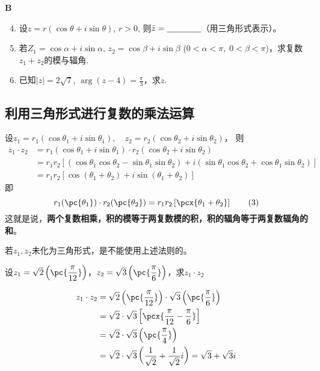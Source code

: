 \begin{center}
    \bfseries B
\end{center}

\begin{enumerate}\setcounter{enumi}{3}
    \item 设$z=r(\cos\theta +i\sin\theta )$, $r>0$, 
    则$\bar z=\underline{\qquad}\underline{\qquad}$（用三角形式表示）。
    \item  若$Z_1=\cos\alpha+i\sin\alpha$, $z_2=\cos\beta+i\sin\beta$ ($0<\alpha<\pi,\; 0<\beta<\pi$)，求复数$z_1+z_2$的模与辐角.
    \item 已知$|z|=2\sqrt{7}$, $\arg(z-4)=\frac{\pi}{3}$，求$z$.
\end{enumerate}

\subsection{利用三角形式进行复数的乘法运算}
设$z_1=r_1(\cos\theta_1+i\sin\theta_1),\quad z_2=r_2(\cos\theta_2+i\sin\theta_2)$，
则
\[\begin{split}
    z_1\cdot z_2&=r_1(\cos\theta_1+i\sin\theta_1)\cdot r_2(\cos\theta_2+i\sin\theta_2)\\
    &=r_1r_2[(\cos\theta_1\cos\theta_2-\sin\theta_1\sin\theta_2)+i(\sin\theta_1
    \cos\theta_2+\cos\theta_1\sin\theta_2)]\\
    &=r_1r_2[\cos(\theta_1+\theta_2)+i\sin(\theta_1+\theta_2)]        
\end{split}\]
即
\begin{equation}
r_1(\pc{\theta_1})\cdot r_2(\pc{\theta_2})=r_1r_2\left[\pcx{\theta_1+\theta_2}\right]\tag{3}
\end{equation}
这就是说，\textbf{两个复数相乘，积的模等于两复数模的积，积的辐角等于两复数辐角的和}。

\begin{remark}
    若$z_1,z_2$未化为三角形式，是不能使用上述法则的。
\end{remark}


\begin{example}
设$z_1=\sqrt{2}\left(\pc{\frac{\pi}{12}}\right)$，$z_2=\sqrt{3}\left(\pc{\frac{\pi}{6}}\right)$，求$z_1\cdot z_2$
\end{example}

\begin{solution}
\[\begin{split}
z_1\cdot z_2&=\sqrt{2}\left(\pc{\frac{\pi}{12}}\right)\cdot \sqrt{3}\left(\pc{\frac{\pi}{6}}\right)\\
&=\sqrt{2}\cdot \sqrt{3}\left[\pcx{\frac{\pi}{12}-\frac{\pi}{6}}\right]\\
&=\sqrt{2}\cdot \sqrt{3}\left(\pc{\frac{\pi}{4}}\right)\\
&=\sqrt{2}\cdot \sqrt{3}\left(\frac{1}{\sqrt{2}}+\frac{1}{\sqrt{2}}i\right)=\sqrt{3}+\sqrt{3}i
\end{split}\]
\end{solution}

